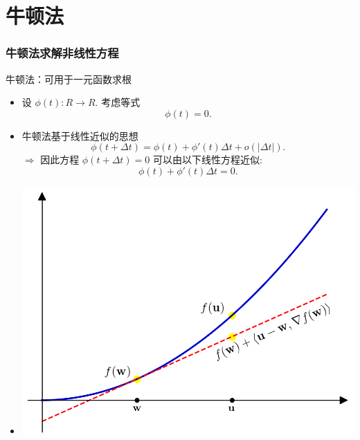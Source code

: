\documentclass[handout,10pt]{beamer} %
\begin{document}
\section{牛顿法} \label{sec_1_2_4}


\begin{frame}[fragile]
\frametitle{牛顿法求解非线性方程}

牛顿法：可用于一元函数求根 

\begin{itemize}
\item<1-> 设 $\phi(t):R\rightarrow R$. 考虑等式
$$
    \phi(t) = 0.
$$
\item<only@2-3> 牛顿法基于线性近似的思想
$$
    \phi(t+\Delta t) = \phi(t) + \phi'(t) \Delta t + o(|\Delta t|).
$$
$\Rightarrow$  因此方程  $\phi(t + \Delta t) = 0$ 可以由以下线性方程近似:
$$
    \phi(t) + \phi'(t) \Delta t = 0.
$$

\item<3-> 
\begin{minipage}{0.5\textwidth}
\end{minipage}
 \begin{minipage}{0.4\textwidth}
\begin{center}
 \includegraphics[width=1.0\textwidth]{figure/newton fig1.png}
 \end{center}
\end{minipage}

\end{itemize}

%








\end{frame}
\end{document}

